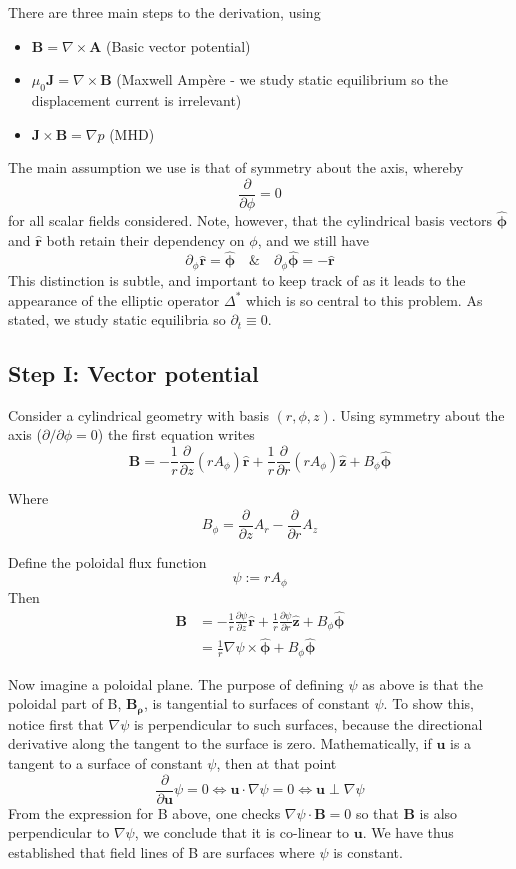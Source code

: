 \documentclass[11pt,a4paper]{article}
\begin{document}
There are three main steps to the derivation, using 
\begin{itemize}
    \item $\mathbf{B}=\nabla \times \mathbf{A}$ (Basic vector potential)
    \item $\mu_0\mathbf{\mathbf{J}}=\nabla \times \mathbf{B}$ (Maxwell Ampère - we study static equilibrium so the displacement current is irrelevant)
    \item $\mathbf{J} \times\mathbf{B}=\nabla p$ (MHD)
\end{itemize}
The main assumption we use is that of symmetry about the axis, whereby 
$$\frac{\partial}{\partial\phi}=0$$
for all scalar fields considered. Note, however, that the cylindrical basis vectors $\hat{\boldsymbol{\phi}}$ and $\mathbf{\hat{r}}$ both retain their dependency on $\phi$, and we still have 
$$\partial_\phi\mathbf{\hat{r}}=\hat{\boldsymbol{\phi}} \quad \& \quad\partial_\phi\hat{\boldsymbol{\phi}}=-\mathbf{\hat{r}}$$
This distinction is subtle, and important to keep track of as it leads to the appearance of the elliptic operator $\Delta^*$ which is so central to this problem. As stated, we study static equilibria so $\partial_t\equiv 0$.

\subsection{Step I: Vector potential}
    Consider a cylindrical geometry with basis $(r, \phi,z)$. Using symmetry about the axis ($\partial/\partial\phi =0$) the first equation writes
    $$\mathbf{B}=-\frac{1}{r}\frac{\partial}{\partial z}(rA_{\phi})\hat{\mathbf{r}}+\frac{1}{r}\frac{\partial}{\partial r}(rA_{\phi})\hat{\mathbf{z}}+B_\phi \hat{\boldsymbol{\phi}}$$
    
    Where 
    $$B_\phi =\frac{\partial}{\partial z}A_r-\frac{\partial}{\partial r}A_z$$
    
    Define the poloidal flux function
    $$\psi:=rA_\phi$$
    Then 
    $$\begin{aligned}
        \mathbf{B}&=-\frac{1}{r}\frac{\partial\psi}{\partial z}\hat{\mathbf{r}}+\frac{1}{r}\frac{\partial \psi}{\partial r}\hat{\mathbf{z}}+B_\phi \hat{\boldsymbol{\phi}}\\
        &=\boxed{\frac{1}{r} \nabla\psi\times\hat{\boldsymbol{\phi}}+B_\phi \hat{\boldsymbol{\phi}}}
    \end{aligned}
    $$

    Now imagine a poloidal plane. The purpose of defining $\psi$ as above is that the poloidal part of B, $\mathbf{B_\rho}$, is tangential to surfaces of constant $\psi$. To show this, notice first that $\nabla\psi$ is perpendicular to such surfaces, because the directional derivative along the tangent to the surface is zero. Mathematically, if $\mathbf{u}$ is a tangent to a surface of constant $\psi$, then at that point 
    $$\frac{\partial}{\partial \mathbf{u}}\psi=0 \iff \mathbf{u} \cdot \nabla\psi=0 \iff \mathbf{u} \perp \nabla\psi$$
    From the expression for B above, one checks $\nabla\psi\cdot\mathbf{B}=0$ so that $\mathbf{B}$ is also perpendicular to $\nabla\psi$, we conclude that it is co-linear to $\mathbf{u}$. We have thus established that field lines of B are surfaces where $\psi$ is constant.
\end{document}
